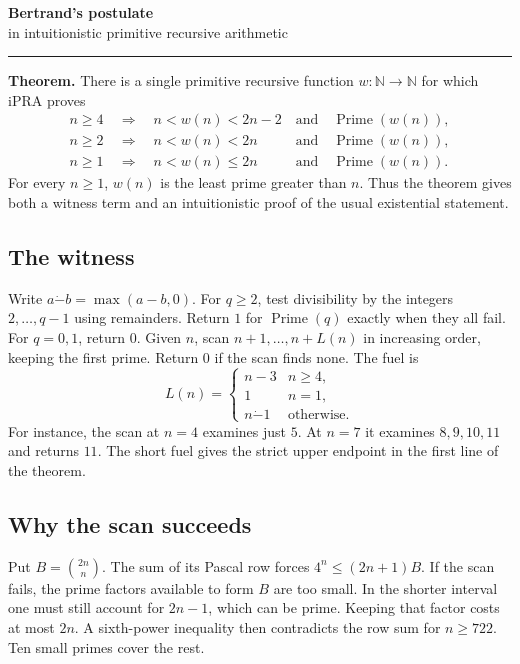 \documentclass[12pt,letterpaper]{article}
\newcommand{\N}{\mathbb N}
\newcommand{\Prime}{\operatorname{Prime}}
\newcommand{\w}{w}
\newcommand{\dotminus}{\mathbin{\dot{-}}}
\newcommand{\lead}[1]{\textsf{\bfseries\color{ink}#1}\enspace}
\begin{document}
\thispagestyle{plain}
{\fontsize{27}{30}\selectfont\sffamily\bfseries\color{ink} Bertrand's postulate}\\[5pt]
{\large\sffamily in intuitionistic primitive recursive arithmetic}
\vspace{11pt}\par
\noindent\textcolor{accent}{\rule{\linewidth}{1pt}}
\medskip

\lead{Theorem.} There is a single primitive recursive function \(\w:\N\to\N\) for which iPRA proves
\begin{align*}
 n\ge4 &\ \Longrightarrow\quad n<\w(n)<2n-2\quad\text{and}\quad\Prime(\w(n)),\\
 n\ge2 &\ \Longrightarrow\quad n<\w(n)<2n\phantom{{}-2}\quad\text{and}\quad\Prime(\w(n)),\\
 n\ge1 &\ \Longrightarrow\quad n<\w(n)\le 2n\phantom{{}-2}\quad\text{and}\quad\Prime(\w(n)).
\end{align*}
For every \(n\ge1\), \(\w(n)\) is the least prime greater than \(n\). Thus the theorem gives both a witness term and an intuitionistic proof of the usual existential statement.

\subsection*{The witness}
Write \(a\dotminus b=\max(a-b,0)\). For \(q\ge2\), test divisibility by the integers \(2,\ldots,q-1\) using remainders. Return \(1\) for \(\Prime(q)\) exactly when they all fail. For \(q=0,1\), return \(0\). Given \(n\), scan \(n+1,\ldots,n+L(n)\) in increasing order, keeping the first prime. Return \(0\) if the scan finds none. The fuel is
\[
 L(n)=
 \begin{cases}n-3& n\ge4,\\1& n=1,\\n\dotminus1& \text{otherwise}.\end{cases}
\]
For instance, the scan at \(n=4\) examines just \(5\). At \(n=7\) it examines \(8,9,10,11\) and returns \(11\). The short fuel gives the strict upper endpoint in the first line of the theorem.

\subsection*{Why the scan succeeds}
Put \(B=\binom{2n}{n}\). The sum of its Pascal row forces \(4^n\le(2n+1)B\). If the scan fails, the prime factors available to form \(B\) are too small. In the shorter interval one must still account for \(2n-1\), which can be prime. Keeping that factor costs at most \(2n\). A sixth-power inequality then contradicts the row sum for \(n\ge722\). Ten small primes cover the rest.
\end{document}

